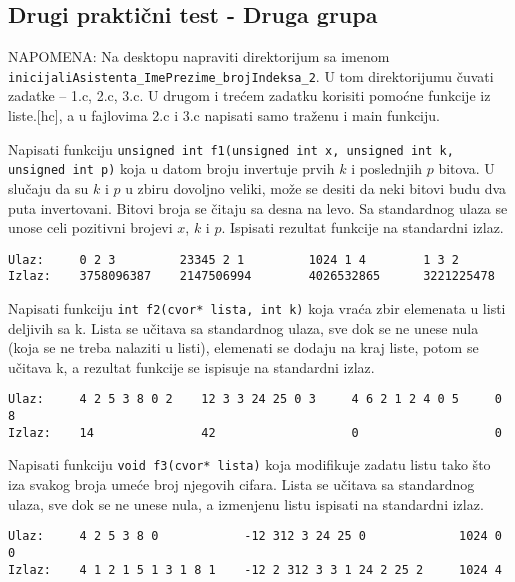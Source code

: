 \subsection{Drugi prakti\v cni test - Druga grupa}

NAPOMENA: Na desktopu napraviti direktorijum sa imenom
\verb|inicijaliAsistenta_ImePrezime_brojIndeksa_2|.  U tom
direktorijumu \v cuvati zadatke -- 1.c, 2.c, 3.c. U drugom i tre\' cem
zadatku korisiti pomo\' cne funkcije iz liste.[hc], a u fajlovima 2.c
i 3.c napisati samo tra\v zenu i main funkciju.

\setcounter{z}{0}

\begin{z}
  Napisati funkciju {\tt unsigned int f1(unsigned int x, unsigned int
    k, unsigned int p)} koja u datom broju invertuje prvih $k$ i
  poslednjih $p$ bitova. U slu\v caju da su $k$ i $p$ u zbiru dovoljno
  veliki, mo\v ze se desiti da neki bitovi budu dva puta
  invertovani. Bitovi broja se \v citaju sa desna na levo. Sa
  standardnog ulaza se unose celi pozitivni brojevi $x$, $k$ i
  $p$. Ispisati rezultat funkcije na standardni izlaz.
\end{z}
\begin{verbatim}
Ulaz:     0 2 3         23345 2 1         1024 1 4        1 3 2
Izlaz:    3758096387    2147506994        4026532865      3221225478
\end{verbatim}

\begin{z}
  Napisati funkciju {\tt int f2(cvor* lista, int k)} koja vra\'ca zbir
  elemenata u listi deljivih sa k. Lista se u\v citava sa standardnog
  ulaza, sve dok se ne unese nula (koja se ne treba nalaziti u listi),
  elemenati se dodaju na kraj liste, potom se u\v citava k, a rezultat
  funkcije se ispisuje na standardni izlaz.
\end{z}
\begin{verbatim}
Ulaz:     4 2 5 3 8 0 2    12 3 3 24 25 0 3     4 6 2 1 2 4 0 5     0 8
Izlaz:    14               42                   0                   0
\end{verbatim}

\begin{z}
  Napisati funkciju {\tt void f3(cvor* lista)} koja modifikuje zadatu
  listu tako \v sto iza svakog broja ume\'ce broj njegovih cifara.
  Lista se u\v citava sa standardnog ulaza, sve dok se ne unese nula,
  a izmenjenu listu ispisati na standardni izlaz.
\end{z}
\begin{verbatim}
Ulaz:     4 2 5 3 8 0            -12 312 3 24 25 0             1024 0      0
Izlaz:    4 1 2 1 5 1 3 1 8 1    -12 2 312 3 3 1 24 2 25 2     1024 4
\end{verbatim}


